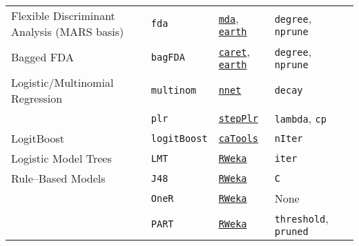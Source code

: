 \documentclass[12pt]{article}
\begin{document}
\begin{landscape}
\begin{longtable}{lllll}
 \rowcolor[rgb]{.95, .95, .95}              
      Flexible Discriminant Analysis (MARS basis) &
         \texttt{fda} & 
             {\tt \href{http://cran.r-project.org/web/packages/mda/index.html}{mda}},  {\tt \href{http://cran.r-project.org/web/packages/earth/index.html}{earth}}       & 
            \texttt{degree}, \texttt{nprune} & \\
      
      Bagged FDA &
         \texttt{bagFDA} & 
             {\tt \href{http://cran.r-project.org/web/packages/caret/index.html}{caret}},   {\tt \href{http://cran.r-project.org/web/packages/earth/index.html}{earth}}      & 
            \texttt{degree}, \texttt{nprune} \\   
            
\rowcolor[rgb]{.95, .95, .95}                     
      Logistic/Multinomial Regression &
         \texttt{multinom} & 
             {\tt \href{http://cran.r-project.org/web/packages/nnet/index.html}{nnet}}     & 
            \texttt{decay}& \\   
      
\rowcolor[rgb]{.95, .95, .95}               
   &
         \texttt{plr} & 
             {\tt \href{http://cran.r-project.org/web/packages/stepPlr/index.html}{stepPlr}}     & 
            \texttt{lambda}, \texttt{cp} & \\     
            
      
      LogitBoost &      
         \texttt{logitBoost} & 
             {\tt \href{http://cran.r-project.org/web/packages/caTools/index.html}{caTools}}      &          
            \texttt{nIter}\\              
            
\rowcolor[rgb]{.95, .95, .95}                     
      Logistic Model Trees &
         \texttt{LMT} & 
            {\tt \href{http://cran.r-project.org/web/packages/RWeka/index.html}{RWeka}}   & 
            \texttt{iter}  \\  
            
      Rule--Based Models &
         \texttt{J48} & 
           {\tt \href{http://cran.r-project.org/web/packages/RWeka/index.html}{RWeka}}   & 
            \texttt{C}  \\  
            
       &
         \texttt{OneR} & 
           {\tt \href{http://cran.r-project.org/web/packages/RWeka/index.html}{RWeka}}   & 
            None  \\  
            
       &
         \texttt{PART} & 
           {\tt \href{http://cran.r-project.org/web/packages/RWeka/index.html}{RWeka}}   & 
            \texttt{threshold}, \texttt{pruned}   \\  
            

\end{longtable}
\end{landscape}
\end{document}
